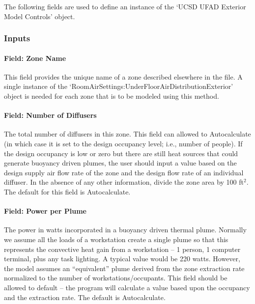 The following fields are used to define an instance of the `UCSD UFAD Exterior Model Controls' object.

\subsubsection{Inputs}\label{inputs-11-016}

\paragraph{Field: Zone Name}\label{field-zone-name-7-003}

This field provides the unique name of a zone described elsewhere in the file. A single instance of the `RoomAirSettings:UnderFloorAirDistributionExterior' object is needed for each zone that is to be modeled using this method.

\paragraph{Field: Number of Diffusers}\label{field-number-of-diffusers-1}

The total number of diffusers in this zone. This field can allowed to Autocalculate (in which case it is set to the design occupancy level; i.e., number of people). If the design occupancy is low or zero but there are still heat sources that could generate buoyancy driven plumes, the user should input a value based on the design supply air flow rate of the zone and the design flow rate of an individual diffuser. In the absence of any other information, divide the zone area by 100 ft\(^{2}\). The default for this field is Autocalculate.

\paragraph{Field: Power per Plume}\label{field-power-per-plume-1}

The power in watts incorporated in a buoyancy driven thermal plume. Normally we assume all the loads of a workstation create a single plume so that this represents the convective heat gain from a workstation -- 1 person, 1 computer terminal, plus any task lighting. A typical value would be 220 watts. However, the model assumes an ``equivalent'' plume derived from the zone extraction rate normalized to the number of workstations/occupants. This field should be allowed to default -- the program will calculate a value based upon the occupancy and the extraction rate. The default is Autocalculate.

